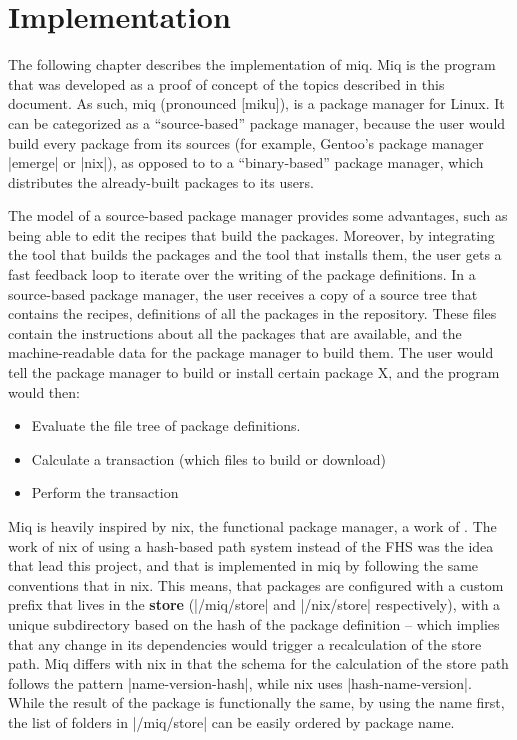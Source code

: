 \FloatBarrier
\chapter{Implementation}

The following chapter describes the implementation of miq.
Miq is the program that was developed as a proof of concept
of the topics described in this document. As such, miq
(pronounced [miku]), is a package manager for Linux. It can
be categorized as a ``source-based'' package manager,
because the user would build every package from its sources
(for example, Gentoo's package manager |emerge| or |nix|),
as opposed to to a ``binary-based'' package manager, which
distributes the already-built packages to its users.

The model of a source-based package manager provides some
advantages, such as being able to edit the recipes that
build the packages. Moreover, by integrating the tool that
builds the packages and the tool that installs them, the
user gets a fast feedback loop to iterate over the writing
of the package definitions. In a source-based package
manager, the user receives a copy of a source tree that
contains the recipes, definitions of all the packages in the
repository. These files contain the instructions about all
the packages that are available, and the machine-readable
data for the package manager to build them. The user would
tell the package manager to build or install certain package
X, and the program would then:

\begin{itemize}
    \item Evaluate the file tree of package definitions.
    \item Calculate a transaction (which files to build or download)
    \item Perform the transaction
\end{itemize}


Miq is heavily inspired by nix, the functional package
manager, a work of 
\cite{dolstraNixOS2008}. The work of nix of using a
hash-based path system instead of the \ac{FHS} was the idea
that lead this project, and that is implemented in miq by
following the same conventions that in nix. This means, that
packages are configured with a custom prefix that lives in
the \textbf{store} (|/miq/store| and |/nix/store| respectively), with
a unique subdirectory based on the hash of the package
definition -- which implies that any change in its
dependencies would trigger a recalculation of the store
path. Miq differs with nix in that the schema for the
calculation of the store path follows the pattern
|name-version-hash|, while nix uses |hash-name-version|.
While the result of the package is functionally the same, by
using the name first, the list of folders in |/miq/store|
can be easily ordered by package name.

